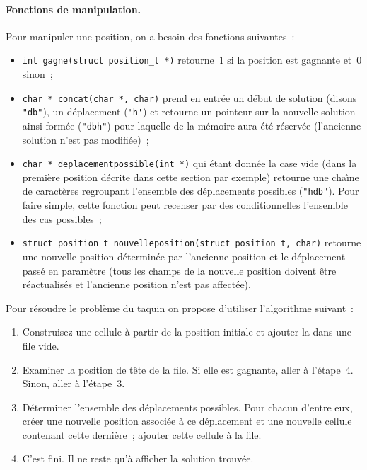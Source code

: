 \paragraph{Fonctions de manipulation.}
Pour manipuler une position, on a besoin des fonctions suivantes~:
\begin{itemize}
\item \verb?int gagne(struct position_t *)? retourne~$1$ si la
  position est gagnante et~$0$ sinon~;
\item \verb?char * concat(char *, char)? prend en entr\'ee un d\'ebut
  de solution (disons \verb?"db"?), un d\'eplacement (\verb?'h'?) et
  retourne un pointeur sur la nouvelle solution ainsi form\'ee
  (\verb?"dbh"?) pour laquelle de la m\'emoire aura \'et\'e
  r\'eserv\'ee (l'ancienne solution n'est pas modifi\'ee)~;
\item \verb?char * deplacementpossible(int *)? qui \'etant donn\'ee
  la case vide (dans la premi\`ere position d\'ecrite dans cette
  section par exemple) retourne une cha\^\i{}ne de caract\`eres
  regroupant l'ensemble des d\'eplacements possibles (\verb?"hdb"?).
  Pour faire simple, cette fonction peut recenser par des
  conditionnelles l'ensemble des cas possibles~;
\item \verb?struct position_t nouvelleposition(struct position_t, char)? %
  retourne une nouvelle position d\'etermin\'ee par l'ancienne
  position et le d\'eplacement pass\'e en param\`etre (tous les
  champs de la nouvelle position doivent \^etre r\'eactualis\'es et
  l'ancienne position n'est pas affect\'ee).
\end{itemize}
\par\medskip
Pour r\'esoudre le probl\`eme du taquin on propose d'utiliser
l'algorithme suivant~:
\begin{enumerate}
\item Construisez une cellule \`a partir de la position initiale et
  ajouter la dans une file vide.
\item Examiner la position de t\^ete de la file. Si elle est gagnante,
  aller \`a l'\'etape~4. Sinon, aller \`a l'\'etape~3.
\item D\'eterminer l'ensemble des d\'eplacements possibles. Pour
  chacun d'entre eux, cr\'eer une nouvelle position associ\'ee \`a ce
  d\'eplacement et une nouvelle cellule contenant cette derni\`ere~;
  ajouter cette cellule \`a la file.
\item C'est fini. Il ne reste qu'\`a afficher la solution trouv\'ee.
\end{enumerate}
